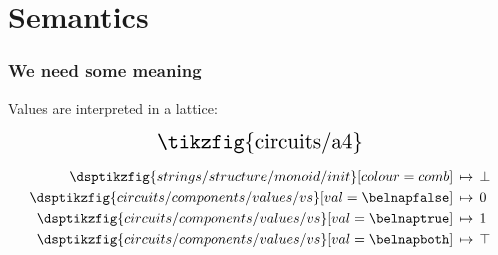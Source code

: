 \section{Semantics}

\begin{frame}
    \frametitle{We need some meaning}

    \pause
    Values are interpreted in a \alert{lattice}:

    \pause
    \begin{minipage}{0.49\textwidth}
        \[
            \scalebox{1.5}{\tikzfig{circuits/a4}}
        \]
    \end{minipage}
    \pause
    \begin{minipage}{0.49\textwidth}
        \begin{align*}
            \dsptikzfig{strings/structure/monoid/init}[colour=comb]
            \,&\mapsto\, \bot \\
            \dsptikzfig{circuits/components/values/vs}[val=\belnapfalse]
            \,&\mapsto\, 0 \\
            \dsptikzfig{circuits/components/values/vs}[val=\belnaptrue]
            \,&\mapsto\, 1 \\
            \dsptikzfig{circuits/components/values/vs}[val=\belnapboth]
            \,&\mapsto\, \top
        \end{align*}
    \end{minipage}
\end{frame}
